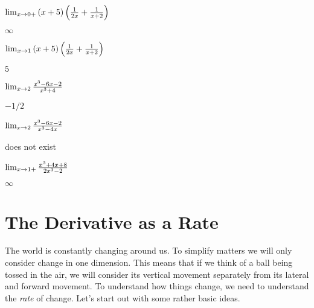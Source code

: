 \begin{exercises}
\begin{exercise} $\lim_{x\to0+}{(x+5)\left({1\over 2x}+{1\over x+2}\right)}$
\begin{answer} $\infty$
\end{answer}\end{exercise}

\begin{exercise} $\lim_{x\to1}{(x+5)\left({1\over 2x}+{1\over x+2}\right)}$
\begin{answer} $5$
\end{answer}\end{exercise}

\begin{exercise} $\lim_{x\to2}{x^3-6x-2\over x^3+4}$
\begin{answer} $-1/2$
\end{answer}\end{exercise}

\begin{exercise} $\lim_{x\to2}{x^3-6x-2\over x^3-4x}$
\begin{answer} does not exist
\end{answer}\end{exercise}

\begin{exercise} $\lim_{x\to1+}{x^3+4x+8\over 2x^3-2}$
\begin{answer} $\infty$
\end{answer}\end{exercise}
\endtwocol
\end{exercises}








\section{The Derivative as a Rate}

The world is constantly changing around us. To simplify matters we
will only consider change in one dimension. This means that if we
think of a ball being tossed in the air, we will consider its vertical
movement separately from its lateral and forward movement.  To
understand how things change, we need to understand the \textit{rate}
of change. Let's start out with some rather basic ideas.

